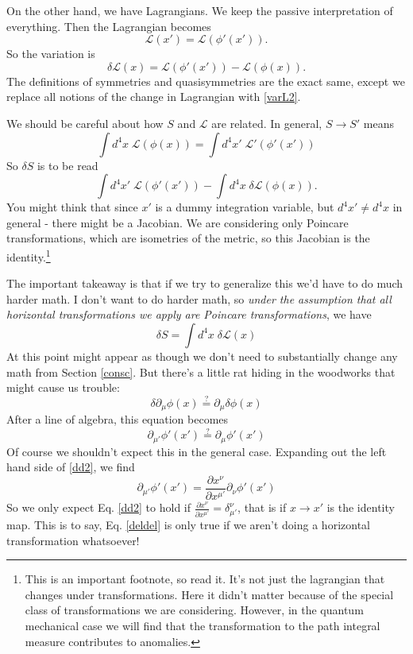 \documentclass[main.tex]{subfiles}
\begin{document}
On the other hand, we have Lagrangians. We keep the passive interpretation of everything. Then the Lagrangian becomes
\begin{equation} \label{L2}
\mathcal{L} (x') = \mathcal{L} (\phi'(x')).
\end{equation}
So the variation is
\begin{equation} \label{varL2}
\delta \mathcal{L} (x) = \mathcal{L}(\phi'(x'))-\mathcal{L}(\phi(x)).
\end{equation}
The definitions of symmetries and quasisymmetries are the exact same, except we replace all notions of the change in Lagrangian with \ref{varL2}.

We should be careful about how $S$ and $\mathcal{L}$ are related. In general, $S \to S'$ means
\[
\int d^4 x \; \mathcal{L}(\phi(x)) = \int d^4 x' \; \mathcal{L}'(\phi'(x')) 
\]
So $\delta S$ is to be read
\[
\int d^4 x' \; \mathcal{L}(\phi'(x')) - \int d^4 x \; \delta \mathcal{L}(\phi(x)).
\]
You might think that since $x'$ is a dummy integration variable, but $d^4 x' \neq d^4 x$ in general - there might be a Jacobian. We are considering only Poincare transformations, which are isometries of the metric, so this Jacobian is the identity.\footnote{This is an important footnote, so read it. It's not just the lagrangian that changes under transformations. Here it didn't matter because of the special class of transformations we are considering. However, in the quantum mechanical case we will find that the transformation to the path integral measure contributes to anomalies.} 

The important takeaway is that if we try to generalize this we'd have to do much harder math. I don't want to do harder math, so \textit{under the assumption that all horizontal transformations we apply are Poincare transformations}, we have
\begin{equation}
\delta S = \int d^4 x \; \delta \mathcal{L} (x)
\end{equation}
At this point might appear as though we don't need to substantially change any math from Section \ref{consc}. But there's a little rat hiding in the woodworks that might cause us trouble:
\begin{equation} \label{deldel}
\delta \partial_{\mu} \phi (x) \stackrel{?}{=} \partial_\mu \delta \phi(x)
\end{equation}
After a line of algebra, this equation becomes
\begin{equation} \label{dd2}
\partial_{\mu'} \phi'(x') \stackrel{?}{=} \partial_\mu \phi'(x')
\end{equation}
Of course we shouldn't expect this in the general case. Expanding out the left hand side of \ref{dd2}, we find
\begin{equation} \label{dd3}
\partial_{\mu'} \phi'(x') = \frac{\partial x^\nu}{\partial x^{\mu'}} \partial_\nu \phi'(x')
\end{equation}
So we only expect Eq. \ref{dd2} to hold if $\frac{\partial x^\nu}{\partial x^{\mu'}} = \delta^\nu_{\mu'}$, that is if $x \to x'$ is the identity map. This is to say, Eq. \ref{deldel} is only true if we aren't doing a horizontal transformation whatsoever!
\end{document}
